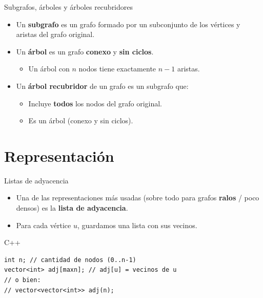 \documentclass[aspectratio=169]{beamer}
\begin{document}
\begin{frame}{Subgrafos, árboles y árboles recubridores}
  \begin{itemize}
    \item Un \textbf{subgrafo} es un grafo formado por un subconjunto de los vértices y aristas del grafo original.
    \item Un \textbf{árbol} es un grafo \textbf{conexo} y \textbf{sin ciclos}.
      \begin{itemize}
        \item Un árbol con \(n\) nodos tiene exactamente \(n-1\) aristas.
      \end{itemize}
    \item Un \textbf{árbol recubridor} de un grafo es un subgrafo que:
      \begin{itemize}
        \item Incluye \textbf{todos} los nodos del grafo original.
        \item Es un árbol (conexo y sin ciclos).
      \end{itemize}
  \end{itemize}
\end{frame}

\section{Representación}

\begin{frame}[fragile]{Listas de adyacencia}
  \begin{itemize}
    \item Una de las representaciones más usadas (sobre todo para grafos \textbf{ralos} / poco densos) es la \textbf{lista de adyacencia}.
    \item Para cada vértice \(u\), guardamos una lista con sus vecinos.
  \end{itemize}
  \begin{block}{C++}
  \begin{lstlisting}[style=customc]
int n; // cantidad de nodos (0..n-1)
vector<int> adj[maxn]; // adj[u] = vecinos de u
// o bien:
// vector<vector<int>> adj(n);
  \end{lstlisting}
  \end{block}
\end{frame}
\end{document}
